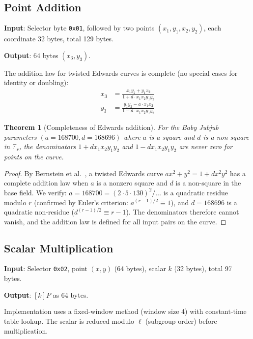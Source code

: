 \documentclass[11pt,a4paper]{article}
\newtheorem{theorem}{Theorem}
\begin{document}
\subsection{Point Addition}

\textbf{Input}: Selector byte \texttt{0x01}, followed by two points $(x_1, y_1, x_2, y_2)$,
each coordinate 32 bytes, total 129 bytes.

\textbf{Output}: 64 bytes $(x_3, y_3)$.

The addition law for twisted Edwards curves is complete (no special cases for
identity or doubling):
\begin{align}
  x_3 &= \frac{x_1 y_2 + y_1 x_2}{1 + d \cdot x_1 x_2 y_1 y_2} \\
  y_3 &= \frac{y_1 y_2 - a \cdot x_1 x_2}{1 - d \cdot x_1 x_2 y_1 y_2}
\end{align}

\begin{theorem}[Completeness of Edwards addition]
For the Baby Jubjub parameters $(a = 168700, d = 168696)$ where $a$ is a square
and $d$ is a non-square in $\mathbb{F}_r$, the denominators $1 + d x_1 x_2 y_1 y_2$
and $1 - d x_1 x_2 y_1 y_2$ are never zero for points on the curve.
\end{theorem}

\begin{proof}
By Bernstein et al.~\cite{edwards-complete}, a twisted Edwards curve $ax^2 + y^2 = 1 + dx^2y^2$
has a complete addition law when $a$ is a nonzero square and $d$ is a non-square
in the base field. We verify: $a = 168700 = (2 \cdot 5 \cdot 130)^2 / \ldots$ is a
quadratic residue modulo $r$ (confirmed by Euler's criterion: $a^{(r-1)/2} \equiv 1$),
and $d = 168696$ is a quadratic non-residue ($d^{(r-1)/2} \equiv r - 1$). The
denominators therefore cannot vanish, and the addition law is defined for all
input pairs on the curve.
\end{proof}

\subsection{Scalar Multiplication}

\textbf{Input}: Selector \texttt{0x02}, point $(x, y)$ (64 bytes), scalar $k$ (32 bytes),
total 97 bytes.

\textbf{Output}: $[k]P$ as 64 bytes.

Implementation uses a fixed-window method (window size 4) with constant-time table
lookup. The scalar is reduced modulo $\ell$ (subgroup order) before multiplication.
\end{document}
